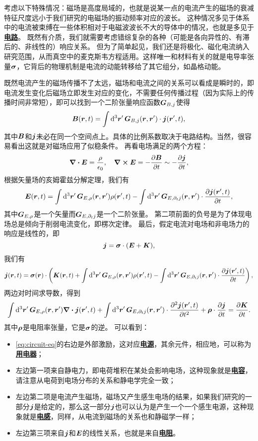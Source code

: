 \documentclass[UTF8, a4paper]{ctexart}
\newcommand*{\concept}[1]{\underline{\textbf{#1}}}
\begin{document}
考虑以下特殊情况：磁场是高度局域的，也就是说某一点的电流产生的磁场的衰减特征尺度远小于我们研究的电磁场的振动频率对应的波长。
这种情况多见于体系中的电流被束缚在一些体积相对于电磁波波长不大的导体中的情况，也就是多见于\concept{电路}。
既然有介质，我们就需要考虑错综复杂的各种（可能是各向异性的、有滞后的、非线性的）响应关系。
但为了简单起见，我们还是将极化、磁化电流纳入研究范围，从而真空中的麦克斯韦方程适用。这样唯一和材料有关的就是电导率张量$\vb*{\sigma}$，它背后的物理机制是电流的动能转移给了其它组分，如晶格动能。

既然电流产生的磁场传播不了太远，磁场和电流之间的关系可以看成是瞬时的，即电流发生变化后磁场立即发生对应的变化，不需要任何传播过程（因为实际上的传播时间非常短），即可以找到一个二阶张量响应函数$\vb*{G}_{B, j}$使得
\[
    \vb*{B}(\vb*{r}, t) = \int \dd[3]{\vb*{r}'} \vb*{G}_{B, j}(\vb*{r}, \vb*{r}') \cdot \vb*{j}(\vb*{r}', t),
\]
其中$\vb*{B}$和$\vb*{j}$未必在同一个空间点上。具体的比例系数取决于电路结构。当然，很容易看出这就是对磁场应用了似稳条件。
再看电场满足的两个方程：
\[
    \div{\vb*{E}} = \frac{\rho}{\epsilon_0}, \quad \curl{\vb*{E}} = - \pdv{\vb*{B}}{t} \sim - \pdv{\vb*{j}}{t},
\]
根据矢量场的亥姆霍兹分解定理，我们有
\[
    \vb*{E}(\vb*{r}, t) = \int \dd[3]{\vb*{r}'} \vb*{G}_{E, \rho}(\vb*{r}, \vb*{r}') \rho(\vb*{r}', t) - \int \dd[3]{\vb*{r}'} \vb*{G}_{E, \partial_t j}(\vb*{r}, \vb*{r}') \cdot \pdv{\vb*{j}(\vb*{r}', t)}{t} ,
\]
其中$\vb*{G}_{E, \rho}$是一个矢量而$\vb*{G}_{E, \partial_t j}$是一个二阶张量。
第二项前面的负号是为了体现电场总是倾向于削弱电流变化，即楞次定律。
最后，假定电流对电场和非电场力的响应是线性的，即
\begin{equation}
    \vb*{j} = \vb*{\sigma} \cdot (\vb*{E} + \vb*{K}),
\end{equation}
我们有
\[
    \vb*{j}(\vb*{r}, t) = \vb*{\sigma}(\vb*{r}) \cdot \left( \vb*{K}(\vb*{r}, t) + \int \dd[3]{\vb*{r}'} \vb*{G}_{E, \rho}(\vb*{r}, \vb*{r}') \rho(\vb*{r}', t) - \int \dd[3]{\vb*{r}'} \vb*{G}_{E, \partial_t j}(\vb*{r}, \vb*{r}') \cdot \pdv{\vb*{j}(\vb*{r}', t)}{t} \right),
\]
两边对时间求导数，得到
\begin{equation}
    \int \dd[3]{\vb*{r}'} \vb*{G}_{E, \rho}(\vb*{r}, \vb*{r}') \div{\vb*{j}}(\vb*{r}', t) + \int \dd[3]{\vb*{r}'} \vb*{G}_{E, \partial_t j}(\vb*{r}, \vb*{r}') \cdot \pdv[2]{\vb*{j}(\vb*{r}', t)}{t} + \vb*{\rho} \cdot \pdv{\vb*{j}}{t} = \pdv{\vb*{K}}{t}.
    \label{eq:circuit-eq}
\end{equation}
其中$\vb*{\rho}$是电阻率张量，它是$\vb*{\sigma}$的逆。
可以看到：
\begin{itemize}
    \item \eqref{eq:circuit-eq}的右边是外部激励，这对应\concept{电源}，其余元件，相应地，可以称为\concept{用电器}；
    \item 左边第一项来自静电力，即电荷堆积在某处会影响电场，这种现象就是\concept{电容}，请注意从电荷到电场分布的关系和静电学完全一致；
    \item 左边第二项是电流产生磁场，磁场又产生感生电场的结果，如果我们研究的一部分$\vb*{j}$是给定的，那么这一部分$\vb*{j}$也可以认为是产生一个一个感生电源，这种现象就是\concept{电感}，同样，从电流到磁场的关系也和静磁学一样；
    \item 左边第三项来自$\vb*{j}$和$\vb*{E}$的线性关系，也就是来自\concept{电阻}。
\end{itemize}
\end{document}
